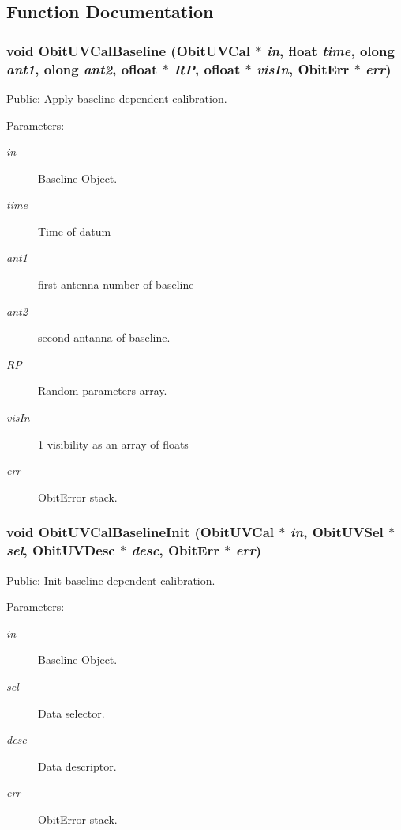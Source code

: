\subsection{Function Documentation}
\subsubsection{\setlength{\rightskip}{0pt plus 5cm}void Obit\-UVCal\-Baseline ({\bf Obit\-UVCal} $\ast$ {\em in}, float {\em time}, {\bf olong} {\em ant1}, {\bf olong} {\em ant2}, {\bf ofloat} $\ast$ {\em RP}, {\bf ofloat} $\ast$ {\em vis\-In}, {\bf Obit\-Err} $\ast$ {\em err})}\label{ObitUVCalBaseline_8h_a1}


Public: Apply baseline dependent calibration. 

\begin{Desc}
\item[Parameters:]
\begin{description}
\item[{\em in}]Baseline Object. \item[{\em time}]Time of datum \item[{\em ant1}]first antenna number of baseline \item[{\em ant2}]second antanna of baseline. \item[{\em RP}]Random parameters array. \item[{\em vis\-In}]1 visibility as an array of floats \item[{\em err}]Obit\-Error stack. \end{description}
\end{Desc}
\subsubsection{\setlength{\rightskip}{0pt plus 5cm}void Obit\-UVCal\-Baseline\-Init ({\bf Obit\-UVCal} $\ast$ {\em in}, {\bf Obit\-UVSel} $\ast$ {\em sel}, {\bf Obit\-UVDesc} $\ast$ {\em desc}, {\bf Obit\-Err} $\ast$ {\em err})}\label{ObitUVCalBaseline_8h_a0}


Public: Init baseline dependent calibration. 

\begin{Desc}
\item[Parameters:]
\begin{description}
\item[{\em in}]Baseline Object. \item[{\em sel}]Data selector. \item[{\em desc}]Data descriptor. \item[{\em err}]Obit\-Error stack. \end{description}
\end{Desc}
